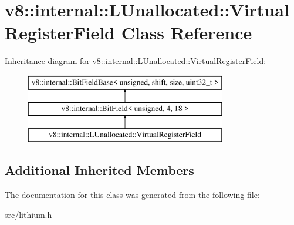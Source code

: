 \hypertarget{classv8_1_1internal_1_1_l_unallocated_1_1_virtual_register_field}{}\section{v8\+:\+:internal\+:\+:L\+Unallocated\+:\+:Virtual\+Register\+Field Class Reference}
\label{classv8_1_1internal_1_1_l_unallocated_1_1_virtual_register_field}
Inheritance diagram for v8\+:\+:internal\+:\+:L\+Unallocated\+:\+:Virtual\+Register\+Field\+:\begin{figure}[H]
\begin{center}
\leavevmode
\includegraphics[height=3.000000cm]{classv8_1_1internal_1_1_l_unallocated_1_1_virtual_register_field}
\end{center}
\end{figure}
\subsection*{Additional Inherited Members}


The documentation for this class was generated from the following file\+:\begin{DoxyCompactItemize}
\item 
src/lithium.\+h\end{DoxyCompactItemize}
